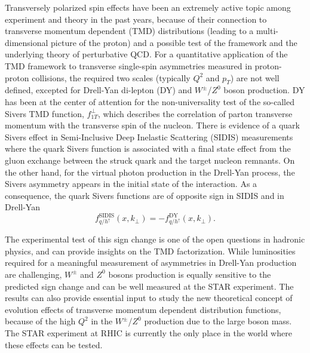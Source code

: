 \documentclass[12pt]{article}
\begin{document}
Transversely polarized spin effects have been an extremely active topic among experiment and theory in the past years, because of their connection to transverse momentum dependent (TMD) distributions (leading to a multi-dimensional picture of the proton) and a possible test of the framework and the underlying theory of perturbative QCD. For a quantitative application of the TMD framework to transverse single-spin asymmetries measured in proton-proton collisions, the required two scales (typically $Q^{2}$ and $p_{T}$) are not well defined, excepted for Drell-Yan di-lepton (DY) and $W^{\pm}$/$Z^{0}$ boson production. DY has been at the center of attention for the non-universality test of the so-called Sivers TMD function, %
$f^{\perp}_{1T}$, which describes the correlation of parton transverse momentum with the transverse spin of the nucleon.  There is evidence of a quark Sivers effect in Semi-Inclusive Deep Inelastic Scattering (SIDIS) measurements where the quark Sivers function is associated with a final state effect from the gluon exchange between the struck quark and the target nucleon remnants. On the other hand, for the virtual photon production in the Drell-Yan process, the Sivers asymmetry appears in the initial state of the interaction. As a consequence, the quark Sivers functions are of opposite sign in SIDIS and in Drell-Yan
%
\begin{equation}
f^\text{SIDIS}_{q/h^\uparrow} (x, k_\perp) = - f^\text{DY}_{q/h^\uparrow} (x, k_\perp).
\end{equation}

The experimental test of this sign change is one of the open questions in hadronic physics, and can provide insights on the TMD factorization. While luminosities required for a meaningful measurement of asymmetries in Drell-Yan production are challenging, $W^{\pm}$ and $Z^{0}$ bosons production is equally sensitive to the predicted sign change and can be well measured at the STAR experiment.  The results can also provide essential input to study the new theoretical concept of evolution effects of transverse momentum dependent distribution functions, because of the high $Q^{2}$ in the $W^{\pm}$/$Z^{0}$ production due to the large boson mass. The STAR experiment at RHIC is currently the only place in the world where these effects can be tested.
\end{document}
